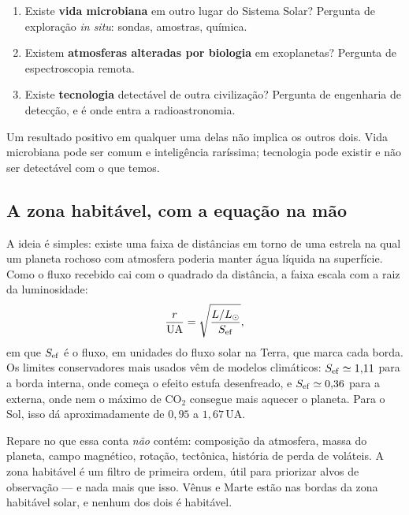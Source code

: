 \documentclass[11pt,a4paper]{article}
\begin{document}
\begin{enumerate}
\item Existe \textbf{vida microbiana} em outro lugar do Sistema Solar? Pergunta de exploração \textit{in situ}: sondas, amostras, química.
\item Existem \textbf{atmosferas alteradas por biologia} em exoplanetas? Pergunta de espectroscopia remota.
\item Existe \textbf{tecnologia} detectável de outra civilização? Pergunta de engenharia de detecção, e é onde entra a radioastronomia.
\end{enumerate}

Um resultado positivo em qualquer uma delas não implica os outros dois. Vida microbiana pode ser comum e inteligência raríssima; tecnologia pode existir e não ser detectável com o que temos.

\subsection*{A zona habitável, com a equação na mão}

A ideia é simples: existe uma faixa de distâncias em torno de uma estrela na qual um planeta rochoso com atmosfera poderia manter água líquida na superfície. Como o fluxo recebido cai com o quadrado da distância, a faixa escala com a raiz da luminosidade:
\[
\frac{r}{\mathrm{UA}}=\sqrt{\frac{L/L_\odot}{S_{\rm ef}}},
\]
em que $S_{\rm ef}$ é o fluxo, em unidades do fluxo solar na Terra, que marca cada borda. Os limites conservadores mais usados vêm de modelos climáticos: $S_{\rm ef}\simeq1{,}11$ para a borda interna, onde começa o efeito estufa desenfreado, e $S_{\rm ef}\simeq0{,}36$ para a externa, onde nem o máximo de CO$_2$ consegue mais aquecer o planeta. Para o Sol, isso dá aproximadamente de $0{,}95$ a $1{,}67\,\mathrm{UA}$.

Repare no que essa conta \emph{não} contém: composição da atmosfera, massa do planeta, campo magnético, rotação, tectônica, história de perda de voláteis. A zona habitável é um filtro de primeira ordem, útil para priorizar alvos de observação --- e nada mais que isso. Vênus e Marte estão nas bordas da zona habitável solar, e nenhum dos dois é habitável.
\end{document}

